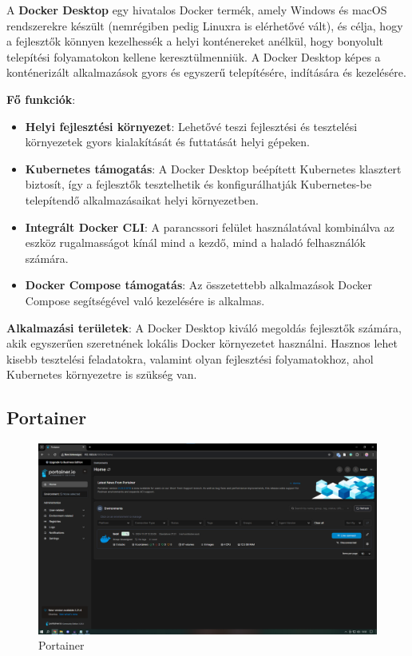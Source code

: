 A \textbf{Docker Desktop} egy hivatalos Docker termék, amely Windows és macOS rendszerekre készült (nemrégiben pedig Linuxra is elérhetővé vált), és célja, hogy a fejlesztők könnyen kezelhessék a helyi konténereket anélkül, hogy bonyolult telepítési folyamatokon kellene keresztülmenniük. A Docker Desktop képes a konténerizált alkalmazások gyors és egyszerű telepítésére, indítására és kezelésére.

\textbf{Fő funkciók}:
\begin{itemize}
	\item \textbf{Helyi fejlesztési környezet}: Lehetővé teszi fejlesztési és tesztelési környezetek gyors kialakítását és futtatását helyi gépeken.
	\item \textbf{Kubernetes támogatás}: A Docker Desktop beépített Kubernetes klasztert biztosít, így a fejlesztők tesztelhetik és konfigurálhatják Kubernetes-be telepítendő alkalmazásaikat helyi környezetben.
	\item \textbf{Integrált Docker CLI}: A parancssori felület használatával kombinálva az eszköz rugalmasságot kínál mind a kezdő, mind a haladó felhasználók számára.
	\item \textbf{Docker Compose támogatás}: Az összetettebb alkalmazások Docker Compose segítségével való kezelésére is alkalmas.
\end{itemize}

\textbf{Alkalmazási területek}:
A Docker Desktop kiváló megoldás fejlesztők számára, akik egyszerűen szeretnének lokális Docker környezetet használni. Hasznos lehet kisebb tesztelési feladatokra, valamint olyan fejlesztési folyamatokhoz, ahol Kubernetes környezetre is szükség van.

\subsection{Portainer}

\begin{figure}[H]
	\centering
	\includegraphics[width=0.7\linewidth]{images/portainer}
	\caption{Portainer}
	\label{fig:portainer}
\end{figure}


